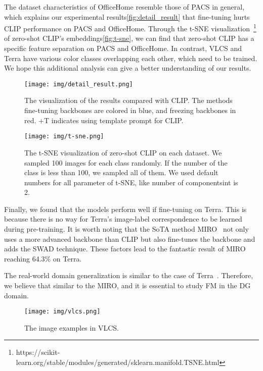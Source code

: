 \documentclass[letterpaper]{article} \usepackage[]{aaai23}
\begin{document}
The dataset characteristics of OfficeHome resemble those of PACS in general, which explains our experimental results\autoref{fig:detail_result} that fine-tuning hurts CLIP performance on PACS and OfficeHome.
Through the t-SNE visualization~\footnote{https://scikit-learn.org/stable/modules/generated/sklearn.manifold.TSNE.html} of zero-shot CLIP's embeddings\autoref{fig:t-sne}, we can find that zero-shot CLIP has a specific feature separation on PACS and OfficeHome. In contrast, VLCS and Terra have various color classes overlapping each other, which need to be trained.
We hope this additional analysis can give a better understanding of our results.


\begin{figure}[h]
\begin{center}
\texttt{[image: img/detail\_result.png]}
\end{center}
  \caption{
  The visualization of the results compared with CLIP.
  The methods fine-tuning backbones are colored in blue, and freezing backbones in red.
  +T indicates using template prompt for CLIP.
}
\label{fig:detail_result}
\end{figure}

\begin{figure}[h]
\begin{center}
\texttt{[image: img/t-sne.png]}
\end{center}
  \caption{
  The t-SNE visualization of zero-shot CLIP on each dataset.
  We sampled 100 images for each class randomly. If the number of the class is less than 100, we sampled all of them.
  We used default numbers for all parameter of t-SNE, like number of componentsint is 2.
}
\label{fig:t-sne}
\end{figure}


Finally, we found that the models perform well if fine-tuning on Terra.
This is because there is no way for Terra's image-label correspondence to be learned during pre-training.
It is worth noting that the SoTA method MIRO~\cite{cha2022domain} not only uses a more advanced backbone than CLIP but also fine-tunes the backbone and adds the SWAD technique. 
These factors lead to the fantastic result of MIRO reaching 64.3\% on Terra.

The real-world domain generalization is similar to the case of Terra~\cite{koh2021wilds}. Therefore, we believe that similar to the MIRO, and it is essential to study FM in the DG domain.


\begin{figure*}[h]
\begin{center}
\texttt{[image: img/vlcs.png]}
\end{center}
  \caption{
  The image examples in VLCS.
}
\label{fig:vlcs}
\end{figure*}
\end{document}
